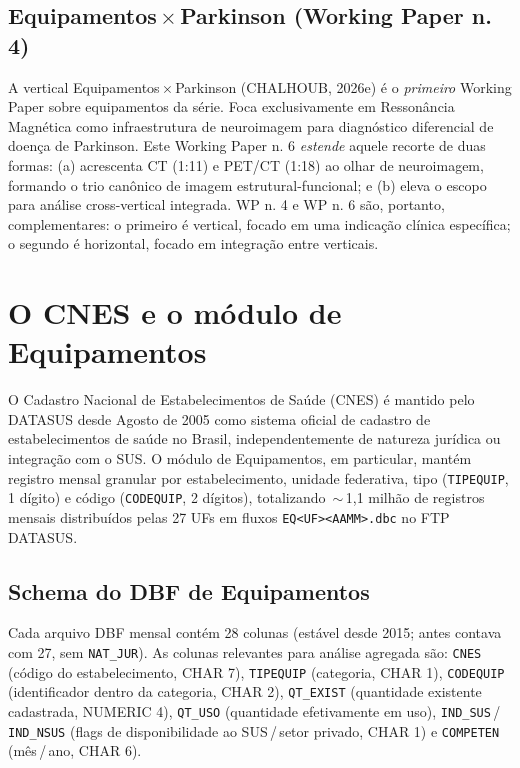 \documentclass[12pt,a4paper,oneside]{article}
\begin{document}
\subsection{Equipamentos\,$\times$\,Parkinson (Working Paper n. 4)}

A vertical Equipamentos\,$\times$\,Parkinson (CHALHOUB, 2026e) é o
\textit{primeiro} Working Paper sobre equipamentos da série.
Foca exclusivamente em Ressonância Magnética como infraestrutura
de neuroimagem para diagnóstico diferencial de doença de Parkinson.
Este Working Paper n. 6 \textit{estende} aquele recorte de duas
formas: (a) acrescenta CT (1{:}11) e PET/CT (1{:}18) ao olhar de
neuroimagem, formando o trio canônico de imagem estrutural-funcional;
e (b) eleva o escopo para análise cross-vertical integrada. WP n. 4
e WP n. 6 são, portanto, complementares: o primeiro é vertical,
focado em uma indicação clínica específica; o segundo é horizontal,
focado em integração entre verticais.

\section{O CNES e o módulo de Equipamentos}\label{sec:cnes}

O Cadastro Nacional de Estabelecimentos de Saúde (CNES) é mantido
pelo DATASUS desde Agosto de 2005 como sistema oficial de cadastro
de estabelecimentos de saúde no Brasil, independentemente de
natureza jurídica ou integração com o SUS. O módulo de Equipamentos,
em particular, mantém registro mensal granular por estabelecimento,
unidade federativa, tipo (\texttt{TIPEQUIP}, 1 dígito) e código
(\texttt{CODEQUIP}, 2 dígitos), totalizando \,$\sim$\,1{,}1 milhão
de registros mensais distribuídos pelas 27 UFs em fluxos
\texttt{EQ<UF><AAMM>.dbc} no FTP DATASUS.

\subsection{Schema do DBF de Equipamentos}

Cada arquivo DBF mensal contém 28 colunas (estável desde 2015;
antes contava com 27, sem \texttt{NAT\_JUR}). As colunas relevantes
para análise agregada são: \texttt{CNES} (código do estabelecimento,
CHAR 7), \texttt{TIPEQUIP} (categoria, CHAR 1), \texttt{CODEQUIP}
(identificador dentro da categoria, CHAR 2), \texttt{QT\_EXIST}
(quantidade existente cadastrada, NUMERIC 4), \texttt{QT\_USO}
(quantidade efetivamente em uso), \texttt{IND\_SUS}\,/\,
\texttt{IND\_NSUS} (flags de disponibilidade ao SUS\,/\,setor
privado, CHAR 1) e \texttt{COMPETEN} (mês\,/\,ano, CHAR 6).
\end{document}
